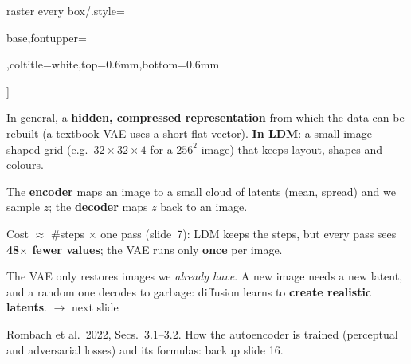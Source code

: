 \documentclass[aspectratio=169,9pt,xcolor=table]{beamer}
\newcommand{\src}[1]{\par\vfill{\color{muted}\fontsize{6.2}{7.4}\selectfont #1\par}}
\begin{document}
\begin{frame}
\begin{tcbraster}
  raster every box/.style={base,fontupper=\footnotesize\raggedright,coltitle=white,top=0.6mm,bottom=0.6mm}]
\begin{tcolorbox}[colframe=hcmusblue,colback=hcmusblue!5!white,title={1. What is a latent?}]
In general, a \textbf{hidden, compressed representation} from which the data can be rebuilt (a textbook VAE uses a short flat vector). \textbf{In LDM}: a small image-shaped grid (e.g.\ $32{\times}32{\times}4$ for a $256^2$ image) that keeps layout, shapes and colours.
\end{tcolorbox}
\begin{tcolorbox}[colframe=hcmusblue!70!black,colback=hcmusblue!5!white,title={2. VAE encoder and decoder}]
The \textbf{encoder} maps an image to a small cloud of latents (mean, spread) and we sample $z$; the \textbf{decoder} maps $z$ back to an image. 
\end{tcolorbox}
\begin{tcolorbox}[colframe=ok,colback=ok!5!white,title={3. Why does it cut the cost?}]
Cost $\approx$ \#steps $\times$ one pass (slide~7): LDM keeps the steps, but every pass sees \textbf{48$\times$ fewer values}; the VAE runs only \textbf{once} per image.
\end{tcolorbox}
\begin{tcolorbox}[colframe=rev,colback=rev!5!white,title={4. Why still need diffusion?}]
The VAE only restores images we \emph{already have}. A new image needs a new latent, and a random one decodes to garbage: diffusion learns to \textbf{create realistic latents}. $\rightarrow$ next slide
\end{tcolorbox}
\end{tcbraster}
\src{Rombach et al.\ 2022, Secs.~3.1--3.2. How the autoencoder is trained (perceptual and adversarial losses) and its formulas: backup slide 16.}
\end{frame}
\end{document}
